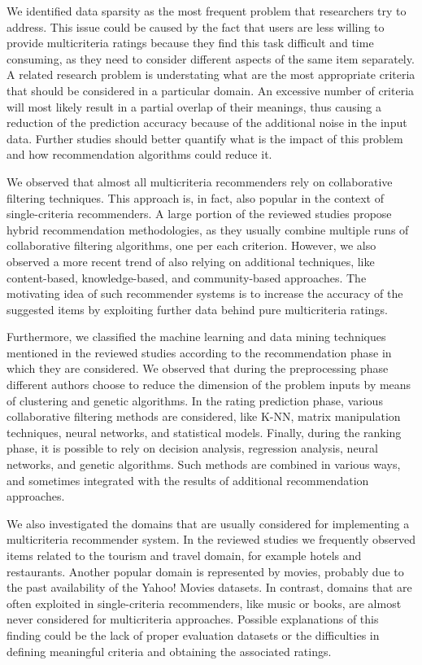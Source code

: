We identified data sparsity as the most frequent problem that researchers try to address. This issue could be caused by the fact that users are less willing to provide multicriteria ratings because they find this task difficult and time consuming, as they need to consider different aspects of the same item separately. A related research problem is understating what are the most appropriate criteria that should be considered in a particular domain. An excessive number of criteria will most likely result in a partial overlap of their meanings, thus causing a reduction of the prediction accuracy because of the additional noise in the input data. Further studies should better quantify what is the impact of this problem and how recommendation algorithms could reduce it.

We observed that almost all multicriteria recommenders rely on collaborative filtering techniques. This approach is, in fact, also popular in the context of single-criteria recommenders. A large portion of the reviewed studies propose hybrid recommendation methodologies, as they usually combine multiple runs of collaborative filtering algorithms, one per each criterion. However, we also observed a more recent trend of also relying on additional techniques, like content-based, knowledge-based, and community-based approaches. The motivating idea of such recommender systems is to increase the accuracy of the suggested items by exploiting further data behind pure multicriteria ratings.

Furthermore, we classified the machine learning and data mining techniques mentioned in the reviewed studies according to the recommendation phase in which they are considered. We observed that during the preprocessing phase different authors choose to reduce the dimension of the problem inputs by means of clustering and genetic algorithms. In the rating prediction phase, various collaborative filtering methods are considered, like K-NN, matrix manipulation techniques, neural networks, and statistical models. Finally, during the ranking phase, it is possible to rely on decision analysis, regression analysis, neural networks, and genetic algorithms. Such methods are combined in various ways, and sometimes integrated with the results of additional recommendation approaches.

We also investigated the domains that are usually considered for implementing a multicriteria recommender system. In the reviewed studies we frequently observed items related to the tourism and travel domain, for example hotels and restaurants. Another popular domain is represented by movies, probably due to the past availability of the Yahoo! Movies datasets. In contrast, domains that are often exploited in single-criteria recommenders, like music or books, are almost never considered for multicriteria approaches. Possible explanations of this finding could be the lack of proper evaluation datasets or the difficulties in defining meaningful criteria and obtaining the associated ratings.

